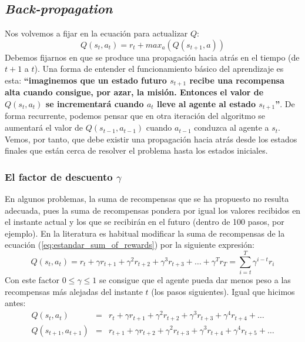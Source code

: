 \documentclass{article}
\begin{document}
\subsection{\textit{Back-propagation}}
Nos volvemos a fijar en la ecuación para actualizar $Q$:
\begin{equation*}
Q(s_t,a_t) = r_t + max_a(Q(s_{t+1},a))
\end{equation*}
Debemos fijarnos en que se produce una propagación hacia atrás en el tiempo (de $t+1$ a $t$). Una forma de entender el funcionamiento básico del aprendizaje es esta: \textbf{``imaginemos que un estado futuro $s_{t+1}$ recibe una recompensa alta cuando consigue, por azar, la misión. Entonces el valor de $Q(s_t, a_t)$ se incrementará cuando $a_t$ lleve al agente al estado $s_{t+1}$''}. De forma recurrente, podemos pensar que en otra iteración del algoritmo se aumentará el valor de $Q(s_{t-1}, a_{t-1})$ cuando $a_{t-1}$ conduzca al agente a $s_{t}$. Vemos, por tanto, que debe existir una propagación hacia atrás desde los estados finales que están cerca de resolver el problema hasta los estados iniciales.



\subsubsection{El factor de descuento $\gamma$}
En algunos problemas, la suma de recompensas que se ha propuesto no resulta adecuada, pues la suma de recompensas pondera por igual los valores recibidos en el instante actual y los que se recibirán en el futuro (dentro de 100 pasos, por ejemplo). En la literatura es habitual modificar la suma de recompensas de la ecuación (\ref{eq:estandar_sum_of_rewards}) por la siguiente expresión:
\begin{equation}
Q(s_t,a_t) = r_t + \gamma r_{t+1}+ \gamma^2 r_{t+2} + \gamma^3r_{t+3} +  \ldots + \gamma^T r_T = \sum_{i=t}^{T} \gamma^{i-t}r_i
\end{equation}
Con este factor $0\leq\gamma\leq1$ se consigue que el agente pueda dar menos peso a las recompensas más alejadas del instante $t$ (los pasos siguientes). Igual que hicimos antes:
\begin{eqnarray*}
Q(s_t,a_t) &=& r_t + \gamma r_{t+1}+ \gamma^2 r_{t+2} + \gamma^3r_{t+3} + \gamma^4r_{t+4} +  \ldots \\
Q(s_{t+1},a_{t+1}) &=& r_{t+1} + \gamma r_{t+2}+ \gamma^2 r_{t+3} + \gamma^3r_{t+4} + \gamma^4r_{t+5} +  \ldots 
\end{eqnarray*}
\end{document}
